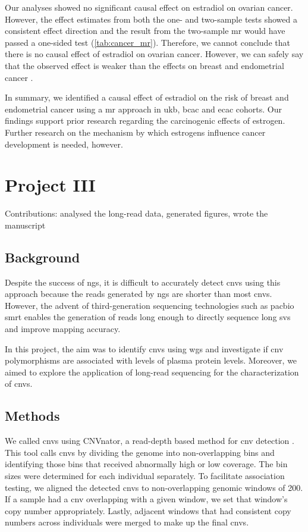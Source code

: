 \documentclass[draft, twoside=false]{scrbook}
\begin{document}
Our analyses showed no significant causal effect on estradiol on ovarian cancer.
However, the effect estimates from both the one- and two-sample tests showed a consistent effect direction and the result from the two-sample \gls{mr} would have passed a one-sided test (\cref{tab:cancer_mr}).
Therefore, we cannot conclude that there is no causal effect of estradiol on ovarian cancer.
However, we can safely say that the observed effect is weaker than the effects on breast and endometrial cancer \cite{Trabert2016,Key2011,Rodriguez2019}.

In summary, we identified a causal effect of estradiol on the risk of breast and endometrial cancer using a \gls{mr} approach in \gls{ukb}, \gls{bcac} and \gls{ecac} cohorts.
Our findings support prior research regarding the carcinogenic effects of estrogen.
Further research on the mechanism by which estrogens influence cancer development is needed, however.

\chapter{Project III}
{
    \parindent 0pt \color{gray}
    Contributions: analysed the long-read data, generated figures, wrote the manuscript
}

\section{Background}
Despite the success of \gls{ngs}, it is difficult to accurately detect \glspl{cnv} using this approach because the reads generated by \gls{ngs} are shorter than most \glspl{cnv}.
However, the advent of third-generation sequencing technologies such as \gls{pacbio} \gls{smrt} enables the generation of reads long enough to directly sequence long \glspl{sv} and improve mapping accuracy.

In this project, the aim was to identify \glspl{cnv} using \gls{wgs} and investigate if \gls{cnv} polymorphisms are associated with levels of plasma protein levels.
Moreover, we aimed to explore the application of long-read sequencing for the characterization of \glspl{cnv}.

\section{Methods}
We called \glspl{cnv} using \textsf{CNVnator}, a read-depth based method for \gls{cnv} detection \cite{Abyzov2011b}.
This tool calls \glspl{cnv} by dividing the genome into non-overlapping bins and identifying those bins that received abnormally high or low coverage.
The bin sizes were determined for each individual separately.
To facilitate association testing, we aligned the detected \glspl{cnv} to non-overlapping genomic windows of \qty{200}{\base}.
If a sample had a \gls{cnv} overlapping with a given window, we set that window's copy number appropriately.
Lastly, adjacent windows that had consistent copy numbers across individuals were merged to make up the final \glspl{cnv}.
\end{document}
